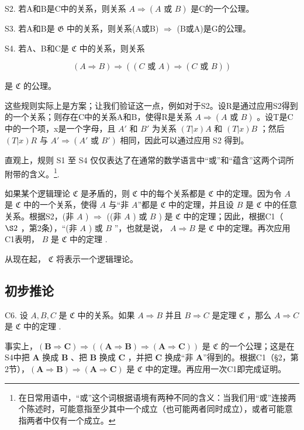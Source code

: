 S2. 若A和B是C中的关系，则关系 \(A \Longrightarrow (A \text{ 或 } B)\) 是C的一个公理。

S3. 若A和B是 \(\mathfrak{G}\) 中的关系，则关系(A或B) \(\Longrightarrow\) (B或A)是G的公理。

S4. 若A、B和C是 \(\mathfrak{C}\) 中的关系，则关系

\[
(A \Rightarrow B) \Rightarrow ((C \text {   或   } A) \Rightarrow (C \text {   或   } B))
\]

是 \(\mathfrak{C}\) 的公理。

这些规则实际上是方案；让我们验证这一点，例如对于S2。设R是通过应用S2得到的一个关系；则存在C中的关系A和B，使得R是关系 \(A \Longrightarrow (A \text{ 或 } B)\) 。设T是C中的一个项，x是一个字母，且 \(A'\) 和 \(B'\) 为关系 \((T|x)A\) 和 \((T|x)B\) ；然后 \((T|x)R\) 与 \(A' \Longrightarrow (A' \text{ 或 } B')\) 相同，因此可以通过应用 S2 得到。

直观上，规则 S1 至 S4 仅仅表达了在通常的数学语言中“或”和“蕴含”这两个词所附带的含义。\footnote{在日常用语中，“或”这个词根据语境有两种不同的含义：当我们用“或”连接两个陈述时，可能意指至少其中一个成立（也可能两者同时成立），或者可能意指两者中仅有一个成立。}.

如果某个逻辑理论 \(\mathfrak{C}\) 是矛盾的，则 \(\mathfrak{C}\) 中的每个关系都是 \(\mathfrak{C}\) 中的定理。因为令 \(A\) 是 \(\mathfrak{C}\) 中的一个关系，使得 \(A\) 与“非 \(A\)”都是 \(\mathfrak{C}\) 中的定理，并且设 \(B\) 是 \(\mathfrak{C}\) 中的任意关系。根据S2，(非 \(A\) ) \(\Longrightarrow\) ((非 \(A\) ) 或 \(B\) ) 是 \(\mathfrak{C}\) 中的定理；因此，根据C1（ \(\S 2\) ，第2条），“(非 \(A\) ) 或 \(B\) ”，也就是说， \(A\Longrightarrow B\) 是 \(\mathfrak{C}\) 中的定理。再次应用C1表明， \(B\) 是 \(\mathfrak{C}\) 中的定理 .

从现在起， \(\mathfrak{C}\) 将表示一个逻辑理论。

\subsection{初步推论}

C6. 设 \(A, B, C\) 是 \(\mathfrak{C}\) 中的关系。如果 \(A \Longrightarrow B\) 并且 \(B \Longrightarrow C\) 是定理 \(\mathfrak{C}\) ，那么 \(A \Longrightarrow C\) 是 \(\mathfrak{C}\) 中的定理 .

事实上，\((\pmb{B} \Rightarrow \pmb{C}) \Rightarrow ((\pmb{A} \Rightarrow \pmb{B}) \Rightarrow (\pmb{A} \Rightarrow \pmb{C}))\) 是 \(\mathfrak{C}\) 的一个公理；这是在S4中把 \(\pmb{A}\) 换成 \(\pmb{B}\) 、把 \(\pmb{B}\) 换成 \(\pmb{C}\) ，并把 \(\pmb{C}\) 换成“非 \(\pmb{A}\)”得到的。根据C1（§2，第2节），\((\pmb{A} \Rightarrow \pmb{B}) \Rightarrow (\pmb{A} \Rightarrow \pmb{C})\) 是 \(\mathfrak{C}\) 中的定理。再应用一次C1即完成证明。


